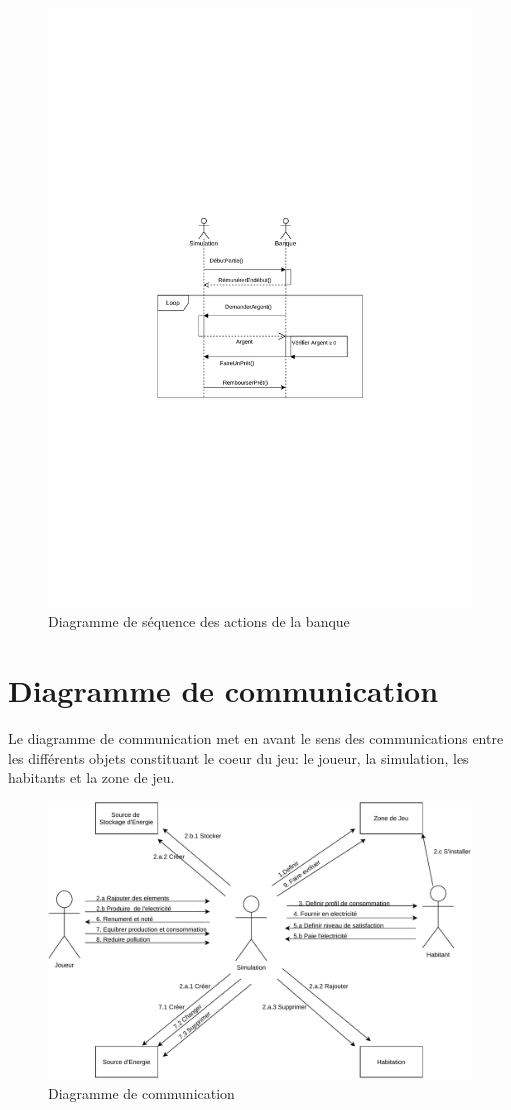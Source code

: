 \documentclass[12pt]{article}
\begin{document}
\begin{figure}[H]
    \includegraphics[width=\textwidth]{uml-sequence-4}
    \caption{Diagramme de séquence des actions de la banque\label{fig:seq-bank}}
\end{figure}

\section{Diagramme de communication}

Le diagramme de communication met en avant le sens des communications entre les différents objets constituant le coeur du jeu: le joueur, la simulation, les habitants et la zone de jeu.

\begin{figure}[H]
    \includegraphics[width=\textwidth]{uml-communication}
    \caption{Diagramme de communication\label{fig:communication}}
\end{figure}
\end{document}
